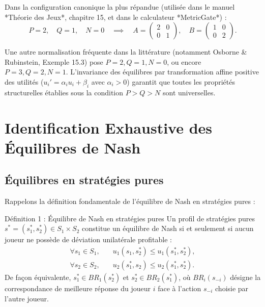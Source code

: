 \documentclass[11pt,a4paper]{article}
\begin{document}
Dans la configuration canonique la plus répandue (utilisée dans le manuel *Théorie des Jeux*, chapitre 15, et dans le calculateur *MetricGate*) :
\begin{equation}\label{eq:matrice_canonique}
P = 2, \quad Q = 1, \quad N = 0 \quad \implies \quad
A = \begin{pmatrix} 2 & 0 \\ 0 & 1 \end{pmatrix}, \quad
B = \begin{pmatrix} 1 & 0 \\ 0 & 2 \end{pmatrix}.
\end{equation}

Une autre normalisation fréquente dans la littérature (notamment Osborne \& Rubinstein, Exemple 15.3) pose $P = 2, Q = 1, N = 0$, ou encore $P = 3, Q = 2, N = 1$. L'invariance des équilibres par transformation affine positive des utilités ($u_i' = \alpha_i u_i + \beta_i$ avec $\alpha_i > 0$) garantit que toutes les propriétés structurelles établies sous la condition $P > Q > N$ sont universelles.

\newpage

\section{Identification Exhaustive des Équilibres de Nash}\label{sec:equilibres}

\subsection{Équilibres en stratégies pures}
Rappelons la définition fondamentale de l'équilibre de Nash en stratégies pures :

\begin{propbox}{Définition 1 : Équilibre de Nash en stratégies pures}
Un profil de stratégies pures $s^* = (s_1^*, s_2^*) \in S_1 \times S_2$ constitue un équilibre de Nash si et seulement si aucun joueur ne possède de déviation unilatérale profitable :
\begin{align}
\forall s_1 \in S_1, & \quad u_1(s_1, s_2^*) \le u_1(s_1^*, s_2^*), \\
\forall s_2 \in S_2, & \quad u_2(s_1^*, s_2) \le u_2(s_1^*, s_2^*).
\end{align}
De façon équivalente, $s_1^* \in BR_1(s_2^*)$ et $s_2^* \in BR_2(s_1^*)$, où $BR_i(s_{-i})$ désigne la correspondance de meilleure réponse du joueur $i$ face à l'action $s_{-i}$ choisie par l'autre joueur.
\end{propbox}
\end{document}
